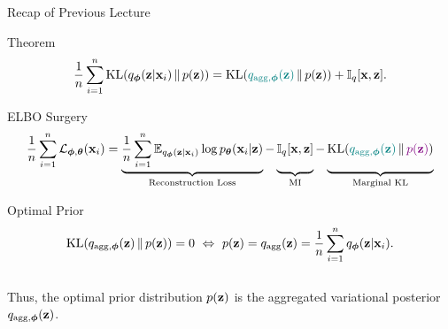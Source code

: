 \documentclass{beamer}
\begin{document}
\begin{frame}{Recap of Previous Lecture}
	\begin{block}{Theorem}
		\vspace{-0.6cm}
		\[
			\frac{1}{n} \sum_{i=1}^n \mathrm{KL}(q_{\boldsymbol{\phi}}(\mathbf{z}| \mathbf{x}_i) \,\|\, p(\mathbf{z})) = \mathrm{KL}({\color{teal}q_{\text{agg}, \boldsymbol{\phi}}(\mathbf{z}) } \,\|\, p(\mathbf{z})) + \mathbb{I}_{q} [\mathbf{x}, \mathbf{z}].
		\]
		\vspace{-0.6cm}
	\end{block}
	\begin{block}{ELBO Surgery}
		\vspace{-0.5cm}
		{\small
		\[		  
		    \frac{1}{n} \sum_{i=1}^n \cL_{\bphi, \btheta}(\bx_i) = \underbrace{\frac{1}{n} \sum_{i=1}^n \bbE_{q_{\bphi}(\bz| \bx_i)} \log \pt(\bx_i | \bz)}_{\text{Reconstruction Loss}}
		    - \underbrace{\vphantom{\sum_{i=1}^n} \bbI_q [\bx, \bz]}_{\text{MI}} - \underbrace{\vphantom{\sum_{i=1}^n} \KL({\color{teal}q_{\text{agg}, \bphi}(\bz)} \,\|\, {\color{violet}p(\bz)})}_{\text{Marginal KL}}
		\]}
	\end{block}
	\vspace{-0.7cm}
	\begin{block}{Optimal Prior}
		\vspace{-0.7cm}
		\[
			\mathrm{KL}(q_{\text{agg}, \boldsymbol{\phi}}(\mathbf{z}) \,\|\, p(\mathbf{z})) = 0 \ \Leftrightarrow \ p (\mathbf{z}) = q_{\text{agg}}(\mathbf{z}) = \frac{1}{n} \sum_{i=1}^n q_{\boldsymbol{\phi}}(\mathbf{z}| \mathbf{x}_i).
		\]
		\vspace{-0.5cm}\\
		Thus, the optimal prior distribution $p(\mathbf{z})$ is the aggregated variational posterior $q_{\text{agg}, \boldsymbol{\phi}}(\mathbf{z})$.
	\end{block}
\end{frame}
\end{document}
